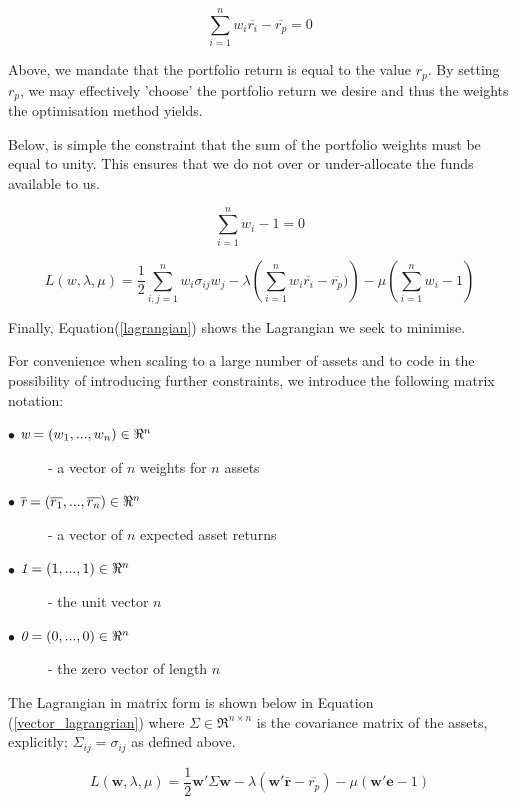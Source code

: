 \documentclass{article}
\begin{document}
\begin{equation}
\sum_{i=1}^{n} w_{i} \overline{r_i} - \overline{r_p} = 0
\label{target_return_constraint}
\end{equation}

Above, we mandate that the portfolio return is equal to the value $r_p$. By setting $r_p$, we may effectively 'choose' the portfolio return we desire and thus the weights the optimisation method yields.

Below, is simple the constraint that the sum of the portfolio weights must be equal to unity. This ensures that we do not over or under-allocate the funds available to us.

\begin{equation} 
\sum_{i=1}^{n} w_{i} - 1 = 0
\label{weights_constraint}
\end{equation}

\begin{equation} 
L(w, \lambda, \mu) =  \dfrac{1}{2} \sum_{i,j=1}^{n} w_{i} \sigma_{ij} w_{j} 
	-\lambda \left( \sum_{i=1}^{n} w_{i} \overline{r_i} - \overline{r_p}) \right)
	- \mu \left( \sum_{i=1}^{n} w_{i} - 1 \right)
\label{lagrangian}
\end{equation}

Finally, Equation(\ref{lagrangian}) shows the Lagrangian we seek to minimise. 

For convenience when scaling to a large number of assets and to code in the possibility of introducing further constraints, we introduce the following matrix notation:

\begin{description}
\item [$\bullet$ $\emph{w} = (w_1,..., w_n) \in \Re^n$ ] - a vector of $n$ weights for $n$ assets
\item [$\bullet$ $\overline{\emph{r}} = (\overline{r_1},..., \overline{r_n}) \in \Re^n$ ] - a vector of $n$ expected asset returns
\item [$\bullet$ $\emph{1} = (1,..., 1) \in \Re^n$ ] - the unit vector $n$
\item [$\bullet$ $\emph{0} = (0,..., 0) \in \Re^n$ ] - the zero vector of length $n$
\end{description}

The Lagrangian in matrix form is shown below in Equation (\ref{vector_lagrangrian}) where $\Sigma \in \Re^{n \times n}$ is the covariance matrix of the assets, explicitly; $\Sigma_{ij} = \sigma_{ij}$ as defined above.

\begin{equation} 
L(\textbf{w}, \lambda, \mu)  = \dfrac{1}{2} \textbf{w}'\Sigma\textbf{w}
-\lambda \left( \textbf{w}'\overline{\textbf{r}} - \overline{r_p}\right)
-\mu \left( \textbf{w}'\textbf{e} - 1\right)
\label{vector_lagrangrian}
\end{equation}
\end{document}
